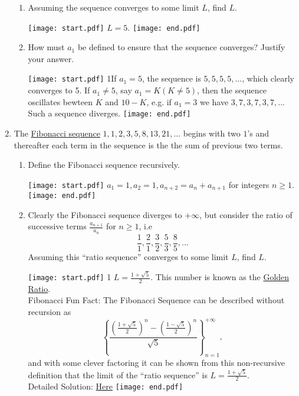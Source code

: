 \documentclass[12pt]{article}
\begin{document}
\begin{enumerate}
\begin{enumerate}

\item Assuming the sequence converges to some limit $L$, find $L$.

\texttt{[image: start.pdf]}
{{$L=5$.}}
\texttt{[image: end.pdf]}


\item How must $a_1$ be defined to ensure that the sequence converges?  Justify your answer.

\texttt{[image: start.pdf]}
{{{1\linewidth}{If $a_1 = 5$, the sequence is $5, 5, 5, 5, ...$, which clearly converges to 5.  If $a_1 \neq 5$, say $a_1 = K (K \neq 5)$, then the sequence oscillates bewteen $K$ and $10-K$, e.g. 
if $a_1 = 3$ we have $3, 7, 3, 7, 3, 7, ...$  Such a sequence diverges.}}}
\texttt{[image: end.pdf]}


\end{enumerate}

\item The \underline{Fibonacci sequence} $1, 1, 2, 3, 5, 8, 13, 21, ...$ begins with two $1$'s and thereafter each term in the sequence is the the sum of previous two terms.

\begin{enumerate}

\item Define the Fibonacci sequence recursively.

\texttt{[image: start.pdf]}
{{$a_1=1, a_2=1, a_{n+2}=a_n + a_{n+1}$ for integers $n\geq1$.}}
\texttt{[image: end.pdf]}


\item Clearly the Fibonacci sequence diverges to $+\infty$, but consider the ratio of successive terms $\frac{a_{n+1}}{a_n}$ for $n\geq1$, i.e $$\frac{1}{1}, \frac{2}{1}, \frac{3}{2}, \frac{5}{3}, 
\frac{8}{5}, ...$$  Assuming this ``ratio sequence'' converges to some limit $L$, find $L$.

\texttt{[image: start.pdf]}
{{{1\linewidth}{ $L=\frac{1+\sqrt{5}}{2}$.  This number is known as the \underline{Golden Ratio}. \\
Fibonacci Fun Fact: The Fibonacci Sequence can be described without recursion as 
$$\left\{ \frac{ \left(\frac{1+\sqrt{5}}{2}\right)^n -  \left(\frac{1-\sqrt{5}}{2}\right)^n} {\sqrt{5}}\right\}_{n = 1}^{+\infty},$$  and with some clever factoring it can be shown from this non-recursive definition
that the limit of the ``ratio sequence'' is $L=\frac{1+\sqrt{5}}{2}$. \\ Detailed Solution: \textcolor{blue}{\href{http://www.math.drexel.edu/classes/Calculus/resources/Math123HW/Solutions/123_05_Sequences_39.pdf}{Here}}}}}
\texttt{[image: end.pdf]}




\end{enumerate}

\end{enumerate}
\end{document}
